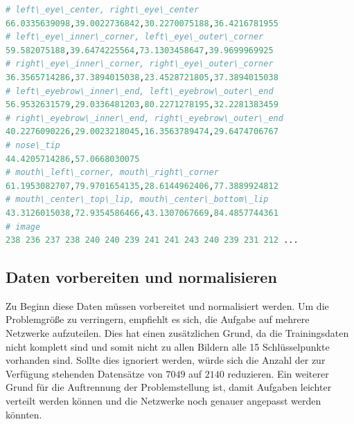 	\begin{lstlisting}[caption={Ein gesamter Datensatz aus den Trainingsdaten mit den X und Y Werten pro Schlüsselpunkt},label=fig:ausgangsdatenRoh,captionpos=b,language=Python]
# left\_eye\_center, right\_eye\_center
66.0335639098,39.0022736842,30.2270075188,36.4216781955
# left\_eye\_inner\_corner, left\_eye\_outer\_corner
59.582075188,39.6474225564,73.1303458647,39.9699969925
# right\_eye\_inner\_corner, right\_eye\_outer\_corner
36.3565714286,37.3894015038,23.4528721805,37.3894015038
# left\_eyebrow\_inner\_end, left\_eyebrow\_outer\_end
56.9532631579,29.0336481203,80.2271278195,32.2281383459
# right\_eyebrow\_inner\_end, right\_eyebrow\_outer\_end
40.2276090226,29.0023218045,16.3563789474,29.6474706767
# nose\_tip
44.4205714286,57.0668030075
# mouth\_left\_corner, mouth\_right\_corner
61.1953082707,79.9701654135,28.6144962406,77.3889924812
# mouth\_center\_top\_lip, mouth\_center\_bottom\_lip
43.3126015038,72.9354586466,43.1307067669,84.4857744361
# image
238 236 237 238 240 240 239 241 241 243 240 239 231 212 ...
\end{lstlisting}

\subsection{Daten vorbereiten und normalisieren}

Zu Beginn diese Daten müssen vorbereitet und normalisiert werden. 
Um die Problemgröße zu verringern, empfiehlt es sich, die Aufgabe auf mehrere Netzwerke aufzuteilen. 
Dies hat einen zusätzlichen Grund, da die Trainingsdaten nicht komplett sind und somit nicht zu allen Bildern alle 15 Schlüsselpunkte vorhanden sind. 
Sollte dies ignoriert werden, würde sich die Anzahl der zur Verfügung stehenden Datensätze von $7049$ auf $2140$ reduzieren. 
Ein weiterer Grund für die Auftrennung der Problemstellung ist, damit Aufgaben leichter verteilt werden können und die Netzwerke noch genauer angepasst werden könnten. \newline

